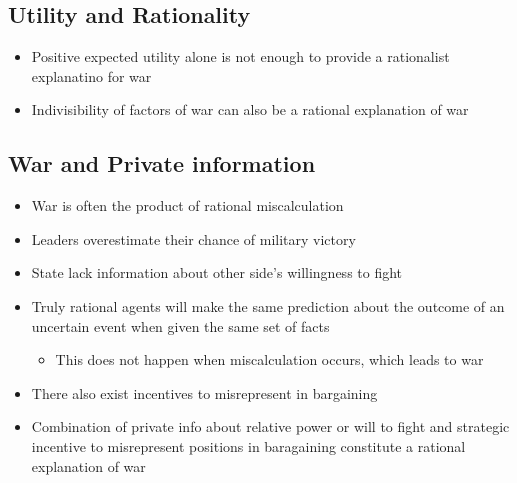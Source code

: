 \documentclass[11pt]{article}
\begin{document}
\subsection{Utility and Rationality}
\label{sec:orgd94da28}
\begin{itemize}
\item Positive expected utility alone is not enough to provide a rationalist explanatino for war
\item Indivisibility of factors of war can also be a rational explanation of war
\end{itemize}
\subsection{War and Private information}
\label{sec:org3404db8}
\begin{itemize}
\item War is often the product of rational miscalculation
\item Leaders overestimate their chance of military victory
\item State lack information about other side's willingness to fight
\item Truly rational agents will make the same prediction about the outcome of an uncertain event when given the same set of facts
\begin{itemize}
\item This does not happen when miscalculation occurs, which leads to war
\end{itemize}
\item There also exist incentives to misrepresent in bargaining
\item Combination of private info about relative power or will to fight and strategic incentive to misrepresent positions in baragaining constitute a rational explanation of war
\end{itemize}
\end{document}
